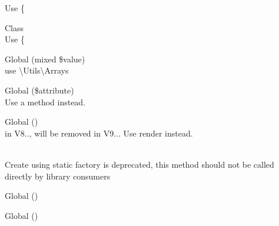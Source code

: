 \begin{DoxyRefList}
Use \{ 
\item[Class \doxylink{class_ramsey_1_1_uuid_1_1_nonstandard_1_1_uuid_v6}{Uuid\+V6} ]\hfill \\
\label{deprecated__deprecated000375}%
%
Use \{ 
\item[Global \doxylink{class_nette_1_1_utils_1_1_validators_aceb16cfda511c925d76ccbfc036aad12}{Validators\+::is\+List} (mixed \$value)]\hfill \\
\label{deprecated__deprecated000258}%
%
use \textbackslash{}\+Utils\textbackslash{}\+Arrays  
\item[Global \doxylink{class_faker_1_1_valid_generator_a58ffd33948550ba0c0ce764acbce71ac}{Valid\+Generator\+::\+\_\+\+\_\+get} (\$attribute)]\hfill \\
\label{deprecated__deprecated000076}%
%
Use a method instead.  
\item[Global \doxylink{class_sabberworm_1_1_c_s_s_1_1_value_1_1_value_list_a7516ca30af0db3cdbf9a7739b48ce91d}{Value\+List\+::\+\_\+\+\_\+to\+String} ()]\hfill \\
\label{deprecated__deprecated000428}%
%
in V8.., will be removed in V9... Use {\ttfamily render} instead.  
\item[Global \doxylink{classphp_documentor_1_1_reflection_1_1_doc_block_1_1_tags_1_1_var___a698b22d43114cd3d0a208d8c1c269da0}{Var\+\_\+\+::create} (string \$body, ?\doxylink{classphp_documentor_1_1_reflection_1_1_type_resolver}{Type\+Resolver} \$type\+Resolver=null, ?\doxylink{classphp_documentor_1_1_reflection_1_1_doc_block_1_1_description_factory}{Description\+Factory} \$description\+Factory=null, ?Type\+Context \$context=null)]\hfill \\
\label{deprecated__deprecated000284}%
%
Create using static factory is deprecated, this method should not be called directly by library consumers  
\item[Global \doxylink{class_jean85_1_1_version_a8f33e9ab40ab322e0c1724aa5c905e01}{Version\+::get\+Commit\+Hash} ()]\hfill \\
\label{deprecated__deprecated000096}%
%
  
\item[Global \doxylink{class_jean85_1_1_version_a52e0b3cd8aaea50cd0ea76982be96e64}{Version\+::get\+Short\+Commit\+Hash} ()]\hfill \\
\label{deprecated__deprecated000097}%
%
  

\end{DoxyRefList}
